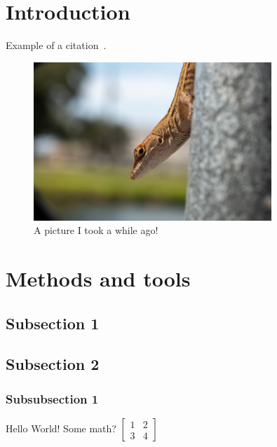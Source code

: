 \section{Introduction}
\label{sec:introduction}

Example of a citation~\cite{latexcompanion}.

\lipsum[1]

\begin{figure}
    \centering
    \includegraphics[width=0.8\textwidth]{assets/graphics/example.jpg}
    \caption{A picture I took a while ago!}
    \label{fig:test-figure}
\end{figure}


\section{Methods and tools}
\label{sec:methods-and-tools}

\subsection{Subsection 1}
\label{subsec:subsec1}

\lipsum[1]

\subsection{Subsection 2}
\label{subsec:subsec2}

\lipsum[2]

\subsubsection{Subsubsection 1}
\label{subsubsec:subsubsec-1}

Hello World!
Some math? \(\begin{bmatrix}
                 1 & 2 \\
                 3 & 4
\end{bmatrix}\)

